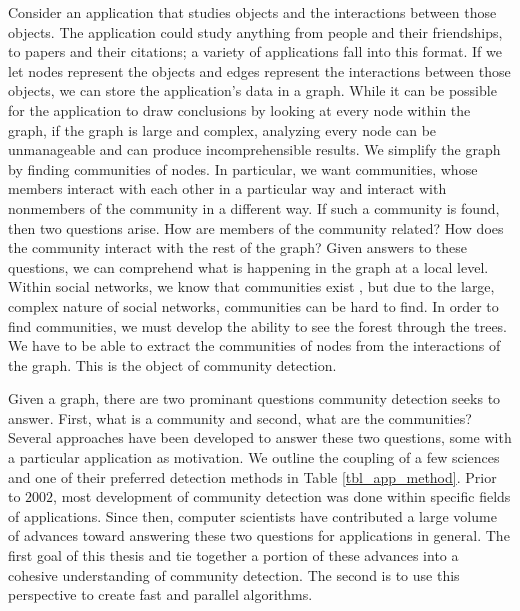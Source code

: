 \documentclass[phd,tocprelim]{cornell}
\begin{document}
Consider an application that studies objects and the interactions between those objects.  The application could study anything from people and their friendships, to papers and their citations; a variety of applications fall into this format.  If we let nodes represent the objects and edges represent the interactions between those objects, we can store the application's data in a graph.  While it can be possible for the application to draw conclusions by looking at every node within the graph, if the graph is large and complex, analyzing every node can be unmanageable and can produce incomprehensible results.   We simplify the graph by finding communities of nodes.  In particular, we want communities, whose members interact with each other in a particular way and interact with nonmembers of the community in a different way. If such a community is found, then two questions arise.  How are members of the community related?  How does the community interact with the rest of the graph?  Given answers to these questions, we can comprehend what is happening in the graph at a local level.  Within social networks, we know that communities exist \cite{JTODO}, but due to the large, complex nature of social networks, communities can be hard to find.  In order to find communities, we must develop the ability to see the forest through the trees.  We have to be able to extract the communities of nodes from the interactions of the graph.  This is the object of community detection.


Given a graph, there are two prominant questions community detection seeks to answer.  First, what is a community and second, what are the communities?  Several approaches have been developed to answer these two questions, some with a particular application as motivation.  We outline the coupling of a few sciences and one of their preferred detection methods in Table \ref{tbl_app_method}. Prior to $2002$, most development of community detection was done within specific fields of applications.  Since then, computer scientists have contributed a large volume of advances toward answering these two questions for applications in general.  The first goal of this thesis and tie together a portion of these advances into a cohesive understanding of community detection.  The second is to use this perspective to create fast and parallel algorithms.
\end{document}
